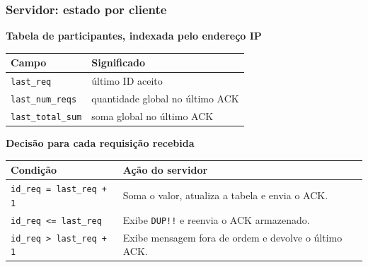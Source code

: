 \documentclass{beamer}
\begin{document}
\begin{frame}
  \frametitle{Servidor: estado por cliente}
  \small
  \textbf{Tabela de participantes, indexada pelo endereço IP}
  \vspace{0.35em}

  \begin{center}
    \renewcommand{\arraystretch}{1.2}
    \begin{tabular}{@{}ll@{}}
      \toprule
      Campo & Significado \\
      \midrule
      \texttt{last\_req} & último ID aceito \\
      \texttt{last\_num\_reqs} & quantidade global no último ACK \\
      \texttt{last\_total\_sum} & soma global no último ACK \\
      \bottomrule
    \end{tabular}
  \end{center}

  \vspace{0.8em}
  \textbf{Decisão para cada requisição recebida}
  \vspace{0.3em}

  \begin{center}
    \renewcommand{\arraystretch}{1.25}
    \begin{tabular}{@{}p{}p{}@{}}
      \toprule
      Condição & Ação do servidor \\
      \midrule
      \texttt{id\_req = last\_req + 1} & Soma o valor, atualiza a tabela e envia o ACK. \\
      \texttt{id\_req <= last\_req} & Exibe \texttt{DUP!!} e reenvia o ACK armazenado. \\
      \texttt{id\_req > last\_req + 1} & Exibe mensagem fora de ordem e devolve o último ACK. \\
      \bottomrule
    \end{tabular}
  \end{center}
\end{frame}
\end{document}
